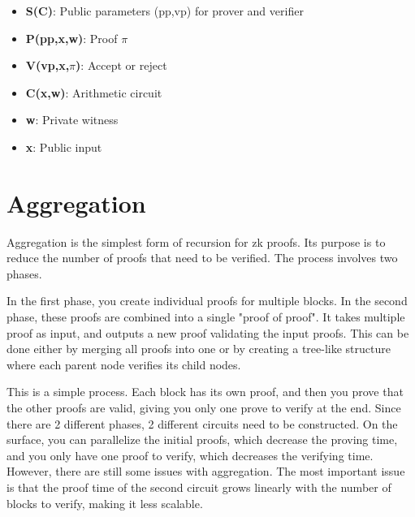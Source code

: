 \begin{itemize}
\item \textbf{S(C)}: Public parameters (pp,vp) for prover and verifier
\item \textbf{P(pp,x,w)}: Proof $\pi$
\item \textbf{V(vp,x,$\pi$)}: Accept or reject
\item \textbf{C(x,w)}: Arithmetic circuit
\item \textbf{w}: Private witness
\item \textbf{x}: Public input
\end{itemize}



\section{Aggregation}
 Aggregation is the simplest form of recursion for zk proofs. Its purpose is to reduce the number of proofs that need to be verified. The process involves two phases.

 In the first phase, you create individual proofs for multiple blocks. In the second phase, these proofs are combined into a single "proof of proof". It takes multiple proof as input,
 and outputs a new proof validating the input proofs.
 This can be done either by merging all proofs into one or by creating a tree-like structure where each parent node verifies its child nodes.

This is a simple process. Each block has its own proof, and then you prove that the other proofs are valid, giving you only one prove
to verify at the end. Since there are 2 different phases, 2 different circuits need to be constructed.
On the surface, you can parallelize the initial proofs, which decrease the proving time, and you only have one proof to verify, which decreases the verifying time.
However, there are still some issues with aggregation. The most important issue is that the proof time of the second circuit grows linearly with the number of blocks to verify, making it less scalable. \cite{Nova23}

